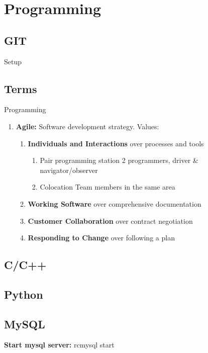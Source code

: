 \chapter{Programming}
\section{GIT}
	\begin{questions}{Setup}
		\begin{questionAnswer}
		\end{questionAnswer}
	\end{questions}

\section{Terms}
\begin{questions}{Programming}
	\begin{questionAnswer}
		\qItem{Agile}{See below \ref{sect:agile}}
	\end{questionAnswer}
	\begin{enumerate}
		\label{sect:agile}
		\item \textbf{Agile: } Software development strategy. Values:
			\begin{enumerate}
				\item \textbf{Individuals and Interactions} over processes and tools
					\begin{enumerate}
						\item Pair programming  station 2 programmers, driver \& navigator/observer
						\item Colocation \ra Team members in the same area
					\end{enumerate}
				\item \textbf{Working Software} over comprehensive documentation
				\item \textbf{Customer Collaboration} over contract negotiation
				\item \textbf{Responding to Change} over following a plan
			\end{enumerate}
	\end{enumerate}
\end{questions}

\section{C/C++}

\section{Python}

\section{MySQL}

\textbf{Start mysql server: } rcmysql start
